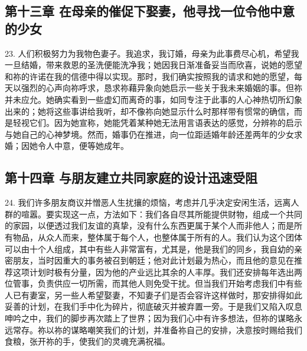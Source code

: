 
\subsection{第十三章 在母亲的催促下娶妻，他寻找一位令他中意的少女}

23. 人们积极努力为我物色妻子。我追求，我订婚，母亲为此事费尽心机，希望我一旦结婚，带来救恩的圣洗便能洗净我；她因我日渐准备妥当而欣喜，说她的愿望和祢的许诺在我的信德中得以实现。那时，我们确实按照我的请求和她的愿望，每天以强烈的心声向祢呼求，恳求祢藉异象向她启示一些关于我未来婚姻的事。但祢并未应允。她确实看到一些虚幻而离奇的事，如同专注于此事的人心神热切所幻象出来的；她将这些事讲给我听，却不像祢向她显示什么时那样带有惯常的确信，而是轻视它们。因为她宣称，她能凭着某种她无法用言语表达的感觉，分辨祢的启示与她自己的心神梦境。然而，婚事仍在推进，向一位距适婚年龄还差两年的少女求婚；因她令人中意，便等她成年。\par


\subsection{第十四章 与朋友建立共同家庭的设计迅速受阻}

24. 我们许多朋友商议并憎恶人生扰攘的烦恼，考虑并几乎决定安闲生活，远离人群的喧嚣。要实现这一点，方法如下：我们各自尽其所能提供财物，组成一个共同的家园，以便透过我们友谊的真挚，没有什么东西更属于某个人而非他人；而是所有物品，从众人而来，整体属于每个人，也整体属于所有的人。我们认为这个团体可以由十个人组成，其中有些人非常富有，尤其是，他是我们的同乡，我自幼的亲密朋友，当时因重大的事务被召到朝廷；他对此计划最为热心，而且他的意见在推荐这项计划时极有分量，因为他的产业远比其余的人丰厚。我们还安排每年选出两位管事，负责供应一切所需，而其他人则免受干扰。但当我们开始考虑我们中有些人已有妻室，另一些人希望娶妻，不知妻子们是否会容许这样做时，那安排得如此妥善的计划，在我们手中化为碎片，彻底破灭并被弃置一旁。于是我们又陷入叹息呻吟之中，我们的脚步再次踏上了世界；因为我们心中有许多想法，但祢的谋略永远常存。祢以祢的谋略嘲笑我们的计划，并准备祢自己的安排，决意按时赐给我们食粮，张开祢的手，使我们的灵魂充满祝福。\par


